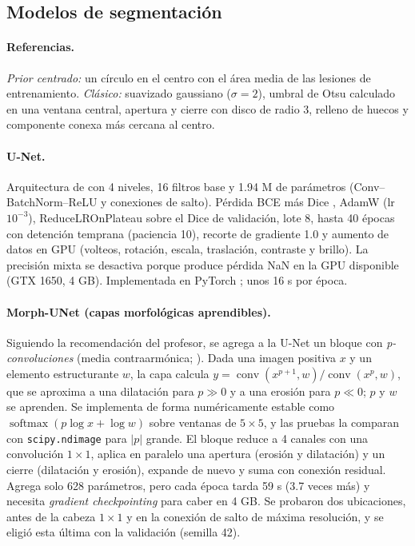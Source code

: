\documentclass[11pt,a4paper]{article}
\begin{document}
\subsection{Modelos de segmentación}
\paragraph{Referencias.} \emph{Prior centrado:} un círculo en el centro con el área media de las lesiones de entrenamiento. \emph{Clásico:} suavizado gaussiano ($\sigma=2$), umbral de Otsu \citep{otsu1979} calculado en una ventana central, apertura y cierre con disco de radio 3, relleno de huecos y componente conexa más cercana al centro.

\paragraph{U-Net.} Arquitectura de \citet{ronneberger2015unet} con 4 niveles, 16 filtros base y 1.94 M de parámetros (Conv--BatchNorm--ReLU y conexiones de salto). Pérdida BCE más Dice \citep{milletari2016vnet}, AdamW \citep{loshchilov2019adamw} (lr $10^{-3}$), ReduceLROnPlateau sobre el Dice de validación, lote 8, hasta 40 épocas con detención temprana (paciencia 10), recorte de gradiente 1.0 y aumento de datos en GPU (volteos, rotación, escala, traslación, contraste y brillo). La precisión mixta se desactiva porque produce pérdida NaN en la GPU disponible (GTX 1650, 4 GB). Implementada en PyTorch \citep{paszke2019pytorch}; unos 16 s por época.

\paragraph{Morph-UNet (capas morfológicas aprendibles).} Siguiendo la recomendación del profesor, se agrega a la U-Net un bloque con \emph{p-convoluciones} (media contraarmónica; \citealp{masci2013morph,kirszenberg2021pconv}). Dada una imagen positiva $x$ y un elemento estructurante $w$, la capa calcula $y=\operatorname{conv}(x^{p+1},w)/\operatorname{conv}(x^{p},w)$, que se aproxima a una dilatación para $p\gg 0$ y a una erosión para $p\ll 0$; $p$ y $w$ se aprenden. Se implementa de forma numéricamente estable como $\operatorname{softmax}(p\log x+\log w)$ sobre ventanas de $5\times5$, y las pruebas la comparan con \texttt{scipy.ndimage} para $|p|$ grande. El bloque reduce a 4 canales con una convolución $1\times1$, aplica en paralelo una apertura (erosión y dilatación) y un cierre (dilatación y erosión), expande de nuevo y suma con conexión residual. Agrega solo 628 parámetros, pero cada época tarda 59 s (3.7 veces más) y necesita \emph{gradient checkpointing} para caber en 4 GB. Se probaron dos ubicaciones, antes de la cabeza $1\times1$ y en la conexión de salto de máxima resolución, y se eligió esta última con la validación (semilla 42).
\end{document}
